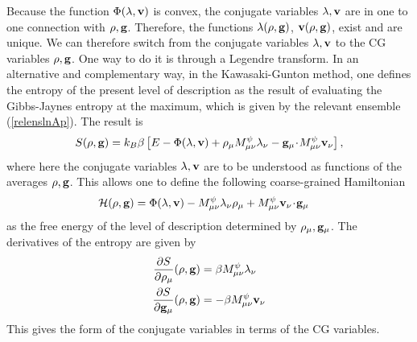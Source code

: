 \documentclass[b5paper,openright,10pt]{book}
\newcommand{\esc}{\!\cdot\!}
\begin{document}
\begin{appendices}
Because the function $ \Phi(\lambda,{\bf v})$ is convex, the conjugate
variables  $\lambda,{\bf  v}$  are  in  one  to  one  connection  with
$\rho,{\bf  g}$.  Therefore,  the  functions $\lambda(\rho,{\bf  g})$,
${\bf  v}(\rho,{\bf g})$,  exist  and are  unique.   We can  therefore
switch  from  the conjugate  variables  $\lambda,{\bf  v}$ to  the  CG
variables $\rho,{\bf  g}$.  One  way to  do it  is through  a Legendre
transform.   In   an  alternative   and  complementary  way,   in  the
Kawasaki-Gunton method, one  defines the entropy of  the present level
of description  as the result  of evaluating the  Gibbs-Jaynes entropy
at  the maximum, which  is given by  the relevant
ensemble (\ref{relenslnAp}).  The result is
\begin{align}
  S(\rho,{\bf g}) =k_B\beta\left[E-\Phi(\lambda,{\bf v})
+\rho_\mu M^\psi_{\mu\nu}\lambda_\nu-{\bf g}_\mu\esc M^\psi_{\mu\nu}{\bf v}_\nu\right],
\label{entropy2}
\end{align}
where  here  the  conjugate  variables $\lambda,{\bf  v}$  are  to  be
understood as functions  of the averages $\rho,{\bf  g}$.  This allows one
to define  the following coarse-grained Hamiltonian
\begin{align}
  {\cal H}(\rho,{\bf g}) &=\Phi(\lambda,{\bf v})
 - M^\psi_{\mu\nu}\lambda_\nu \rho_\mu+M^\psi_{\mu\nu}{\bf v}_\nu\esc {\bf g}_\mu
\label{olegApp}
\end{align}
as  the  free  energy  of  the  level  of  description  determined  by
$\rho_\mu,{\bf g}_\mu$. The derivatives of the entropy are given by
\begin{align}
\frac{\partial S}{\partial \rho_\mu} (\rho,{\bf g}) &=\beta M^\psi_{\mu\nu}\lambda_\nu
\nonumber\\
\frac{\partial S}{\partial {\bf g}_\mu} (\rho,{\bf g}) &=- \beta M^\psi_{\mu\nu}{\bf v}_\nu
\label{derS}
\end{align}
This gives the form of the conjugate variables in terms of the CG variables.

\end{appendices}
\end{document}
